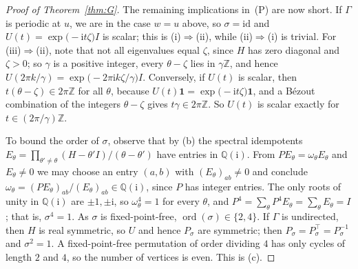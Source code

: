 \documentclass[preprint,11pt]{elsarticle}
\theoremstyle{definition}
\theoremstyle{remark}
\DeclareMathOperator{\ord}{ord}
\newcommand{\Z}{\mathbb Z}
\newcommand{\Q}{\mathbb Q}
\newcommand{\ii}{\mathrm i}
\begin{document}
\begin{proof}[Proof of Theorem~\ref{thm:G}]
The remaining implications in~(P) are now short. If $\Gamma$ is periodic at $u$, we are in the case $w=u$ above, so $\sigma=\mathrm{id}$ and $U(t)=\exp\bigl(-\ii t\zeta\bigr)I$ is scalar; this is (i)$\Rightarrow$(ii), while (ii)$\Rightarrow$(i) is trivial. For (iii)$\Rightarrow$(ii), note that not all eigenvalues equal $\zeta$, since $H$ has zero diagonal and $\zeta>0$; so $\gamma$ is a positive integer, every $\theta-\zeta$ lies in $\gamma\Z$, and hence $U(2\pi k/\gamma)=\exp\bigl(-2\pi\ii k\zeta/\gamma\bigr)I$. Conversely, if $U(t)$ is scalar, then $t(\theta-\zeta)\in2\pi\Z$ for all $\theta$, because $U(t)\mathbf 1=\exp\bigl(-\ii t\zeta\bigr)\mathbf 1$, and a B\'ezout combination of the integers $\theta-\zeta$ gives $t\gamma\in2\pi\Z$. So $U(t)$ is scalar exactly for $t\in(2\pi/\gamma)\Z$.

To bound the order of $\sigma$, observe that by (b) the spectral idempotents $E_\theta=\prod_{\theta'\ne\theta}(H-\theta'I)/(\theta-\theta')$ have entries in $\Q(\ii)$. From $PE_\theta=\omega_\theta E_\theta$ and $E_\theta\ne0$ we may choose an entry $(a,b)$ with $(E_\theta)_{ab}\ne0$ and conclude $\omega_\theta=(PE_\theta)_{ab}/(E_\theta)_{ab}\in\Q(\ii)$, since $P$ has integer entries. The only roots of unity in $\Q(\ii)$ are $\pm1,\pm\ii$, so $\omega_\theta^4=1$ for every $\theta$, and $P^4=\sum_\theta P^4E_\theta=\sum_\theta E_\theta=I$; that is, $\sigma^4=1$. As $\sigma$ is fixed-point-free, $\ord(\sigma)\in\{2,4\}$. If $\Gamma$ is undirected, then $H$ is real symmetric, so $U$ and hence $P_\sigma$ are symmetric; then $P_\sigma=P_\sigma^\top=P_\sigma^{-1}$ and $\sigma^2=1$. A fixed-point-free permutation of order dividing $4$ has only cycles of length $2$ and $4$, so the number of vertices is even. This is (c).


\end{proof}
\end{document}
